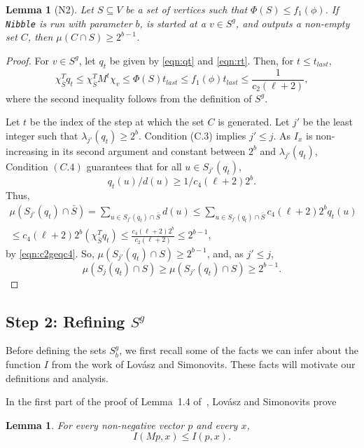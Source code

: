 \documentclass[11pt]{article}
\newtheorem{lemma}[theorem]{Lemma}
\newcommand{\setj}[2]{S_{#1} (#2)}
\newcommand{\lamj}[2]{\lambda_{#1} (#2)}
\def\intersect{\cap}
\def\intersect{\cap}
\def\vol#1{\mu \left(#1  \right)}
\begin{document}
\begin{lemma}[N2]\label{lem:N3}
Let $S \subseteq V$ be a set of vertices such that
  $\Phi (S) \leq f_{1} (\phi )$.
If \texttt{Nibble} is run with parameter $b$,
  is started at a $v \in S^{g}$,
  and outputs a non-empty set $C$, then
  $\vol{C \intersect S} \geq 2^{b-1}$.
\end{lemma}
\begin{proof}
For $v \in S^{g}$, let $q_{t}$ be given by \eqref{eqn:qt} and \eqref{eqn:rt}.
Then, for $t \leq t_{last}$,
\[
  \chi_{\bar{S}}^{T} q_{t}
\leq \chi_{\bar{S}}^{T} M^{t} \chi_{v}
\leq  \Phi (S) t_{last}
  \leq  f_{1} (\phi ) t_{last}
  \leq \frac{1}{c_{2} (\ell +2) },
\]
where the second inequality follows from the definition of $S^{g}$.


Let $t$ be the index of the step at which the set $C$ is generated.
Let $j'$ be the least integer such that
  $\lamj{j'}{q_{t}} \geq 2^{b}$.
Condition (C.3) implies $j' \leq j$.
As $I_{x}$ is non-increasing in its second argument and
  constant between $2^{b}$ and  $\lamj{j'}{q_{t}}$,
  Condition $(C.4)$ guarantees that for all
  $u \in \setj{j'}{q_{t}}$,
\[
q_{t} (u) / d (u) \geq 1/ c_{4} (\ell +2) 2^{b}.
\]
Thus,
\begin{multline*}
\vol{\setj{j'}{q_{t}} \intersect \bar{S}}
=
  \sum_{u \in \setj{j'}{q_{t}} \intersect \bar{S}} d (u)
\leq
  \sum_{u \in \setj{j'}{q_{t}} \intersect \bar{S}} c_{4} (\ell +2) 2^{b} q_{t} (u)
\\
\leq
  c_{4} (\ell +2) 2^{b} (\chi_{\bar{S}}^{T} q_{t})
\leq 
  \frac{c_{4} (\ell +2) 2^{b}}{c_{2} (\ell +2)}
\leq
  2^{b-1},
\end{multline*}
by \eqref{eqn:c2geqc4}.
So, $\vol{\setj{j'}{q_{t}} \intersect S} \geq 2^{b-1}$,
 and, as $j' \leq j$,
\[
\vol{\setj{j}{q_{t}}\intersect S} 
\geq
\vol{\setj{j'}{q_{t}} \intersect S} \geq 2^{b-1}.
\]
\end{proof}

\subsection*{Step 2: Refining $S^{g}$}

Before defining the sets $S^{g}_{b}$,
  we first recall some of the facts we can infer about
  the function $I$ from the work of Lov\'asz and Simonovits.
These facts will motivate our definitions and analysis.

In the first part of the proof of Lemma~1.4 of~\cite{LovaszSimonovitsFOCS},
 Lov\'asz and Simonovits prove
\begin{lemma}\label{lem:LSeasy}
For every non-negative vector $p$ and every $x$,
\begin{equation}\label{eqn:LSsimple}
  I (M p, x) \leq I (p, x).
\end{equation}
\end{lemma}
\end{document}
